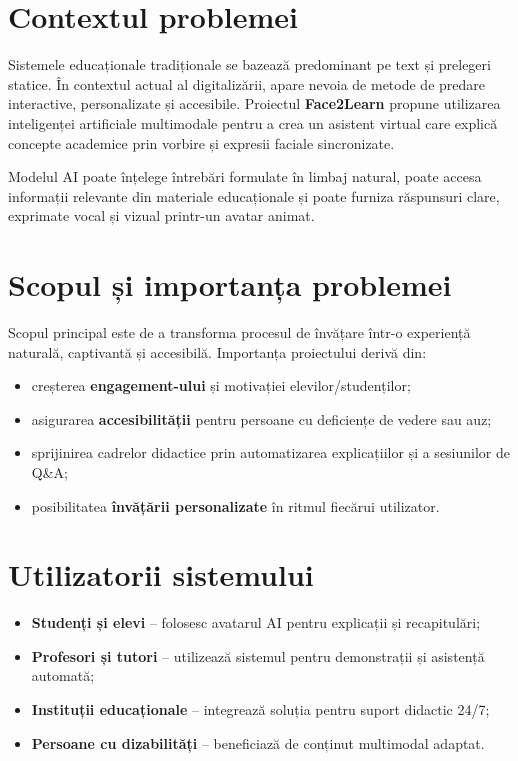 \documentclass[12pt,a4paper]{report}
\begin{document}
\section{Contextul problemei}
Sistemele educaționale tradiționale se bazează predominant pe text și prelegeri statice. În contextul actual al digitalizării, apare nevoia de metode de predare interactive, personalizate și accesibile. Proiectul \textbf{Face2Learn} propune utilizarea inteligenței artificiale multimodale pentru a crea un asistent virtual care explică concepte academice prin vorbire și expresii faciale sincronizate.

Modelul AI poate înțelege întrebări formulate în limbaj natural, poate accesa informații relevante din materiale educaționale și poate furniza răspunsuri clare, exprimate vocal și vizual printr-un avatar animat.

\section{Scopul și importanța problemei}
Scopul principal este de a transforma procesul de învățare într-o experiență naturală, captivantă și accesibilă. Importanța proiectului derivă din:
\begin{itemize}
  \item creșterea \textbf{engagement-ului} și motivației elevilor/studenților;
  \item asigurarea \textbf{accesibilității} pentru persoane cu deficiențe de vedere sau auz;
  \item sprijinirea cadrelor didactice prin automatizarea explicațiilor și a sesiunilor de Q\&A;
  \item posibilitatea \textbf{învățării personalizate} în ritmul fiecărui utilizator.
\end{itemize}

\section{Utilizatorii sistemului}
\begin{itemize}
  \item \textbf{Studenți și elevi} – folosesc avatarul AI pentru explicații și recapitulări;
  \item \textbf{Profesori și tutori} – utilizează sistemul pentru demonstrații și asistență automată;
  \item \textbf{Instituții educaționale} – integrează soluția pentru suport didactic 24/7;
  \item \textbf{Persoane cu dizabilități} – beneficiază de conținut multimodal adaptat.
\end{itemize}
\end{document}
